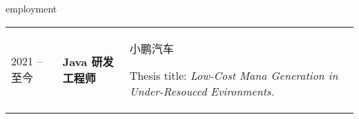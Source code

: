
\begin{rubric}{employment}
    \begin{tabular}{@{}p{3cm}p{4cm}p{6cm}@{}}
        2021 -- 至今 & \textbf{Java 研发工程师} & 小鹏汽车
        \par Thesis title: \emph{Low-Cost Mana Generation in Under-Resouced Evironments.}
    \end{tabular}
	
%
%
\end{rubric}
